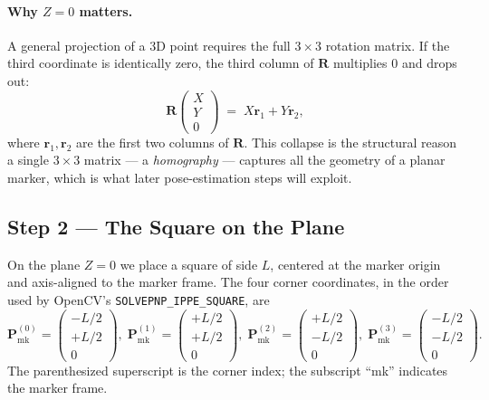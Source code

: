 \documentclass[11pt,a4paper]{article}
\theoremstyle{definition}
\theoremstyle{plain}
\theoremstyle{remark}
\newcommand{\flag}{\texttt{SOLVEPNP\allowbreak\_IPPE\allowbreak\_SQUARE}}
\newcommand{\Pmark}{\mathbf{P}_{\text{mk}}}
\begin{document}
\paragraph{Why $Z = 0$ matters.}
A general projection of a 3D point requires the full $3\times 3$ rotation
matrix. If the third coordinate is identically zero, the third column of
$\mathbf{R}$ multiplies $0$ and drops out:
\begin{equation}
  \mathbf{R} \begin{pmatrix} X \\ Y \\ 0 \end{pmatrix}
  \;=\; X \mathbf{r}_1 + Y \mathbf{r}_2,
\end{equation}
where $\mathbf{r}_1, \mathbf{r}_2$ are the first two columns of $\mathbf{R}$. This
collapse is the structural reason a single $3\times 3$ matrix --- a
\emph{homography} --- captures all the geometry of a planar marker, which
is what later pose-estimation steps will exploit.

\subsection{Step 2 --- The Square on the Plane}

On the plane $Z = 0$ we place a square of side $L$, centered at the marker
origin and axis-aligned to the marker frame. The four corner coordinates,
in the order used by OpenCV's \flag, are
\begin{equation}
  \Pmark^{(0)} = \begin{pmatrix} -L/2 \\ +L/2 \\ 0 \end{pmatrix}, \;
  \Pmark^{(1)} = \begin{pmatrix} +L/2 \\ +L/2 \\ 0 \end{pmatrix}, \;
  \Pmark^{(2)} = \begin{pmatrix} +L/2 \\ -L/2 \\ 0 \end{pmatrix}, \;
  \Pmark^{(3)} = \begin{pmatrix} -L/2 \\ -L/2 \\ 0 \end{pmatrix}.
\end{equation}
The parenthesized superscript is the corner index; the subscript ``mk''
indicates the marker frame.
\end{document}
